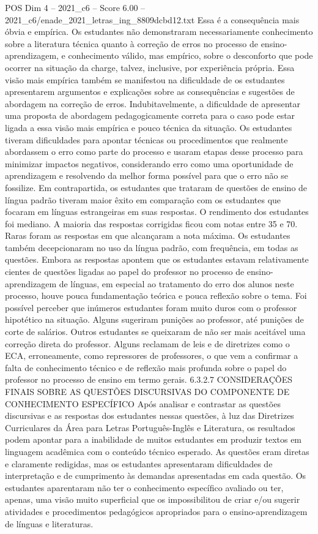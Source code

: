 \begin{textsample}{POS Dim 4 – 2021\_c6 – Score 6.00 – 2021\_c6/enade\_2021\_letras\_ing\_8809dcbd12.txt}
Essa é a consequência mais óbvia e empírica.
Os estudantes não demonstraram necessariamente conhecimento sobre a literatura técnica quanto à correção de erros no processo de ensino-aprendizagem, e conhecimento válido, mas empírico, sobre o desconforto que pode ocorrer na situação da charge, talvez, inclusive, por experiência própria.
Essa visão mais empírica também se manifestou na dificuldade de os estudantes apresentarem argumentos e explicações sobre as consequências e sugestões de abordagem na correção de erros.
Indubitavelmente, a dificuldade de apresentar uma proposta de abordagem pedagogicamente correta para o caso pode estar ligada a essa visão mais empírica e pouco técnica da situação.
Os estudantes tiveram dificuldades para apontar técnicas ou procedimentos que realmente abordassem o erro como parte do processo e usaram etapas desse processo para minimizar impactos negativos, considerando erro como uma oportunidade de aprendizagem e resolvendo da melhor forma possível para que o erro não se fossilize.
Em contrapartida, os estudantes que trataram de questões de ensino de língua padrão tiveram maior êxito em comparação com os estudantes que focaram em línguas estrangeiras em suas respostas.
O rendimento dos estudantes foi mediano.
A maioria das respostas corrigidas ficou com notas entre 35 e 70.
Raras foram as respostas em que alcançaram a nota máxima.
Os estudantes também decepcionaram no uso da língua padrão, com frequência, em todas as questões.
Embora as respostas apontem que os estudantes estavam relativamente cientes de questões ligadas ao papel do professor no processo de ensino-aprendizagem de línguas, em especial ao tratamento do erro dos alunos neste processo, houve pouca fundamentação teórica e pouca reflexão sobre o tema.
Foi possível perceber que inúmeros estudantes foram muito duros com o professor hipotético na situação.
Alguns sugeriram punições ao professor, até punições de corte de salários.
Outros estudantes se queixaram de não ser mais aceitável uma correção direta do professor.
Alguns reclamam de leis e de diretrizes como o ECA, erroneamente, como repressores de professores, o que vem a confirmar a falta de conhecimento técnico e de reflexão mais profunda sobre o papel do professor no processo de ensino em termo gerais. 6.3.2.7 CONSIDERAÇÕES FINAIS SOBRE AS QUESTÕES DISCURSIVAS DO COMPONENTE DE CONHECIMENTO ESPECÍFICO Após analisar e contrastar as questões discursivas e as respostas dos estudantes nessas questões, à luz das Diretrizes Curriculares da Área para Letras Português-Inglês e Literatura, os resultados podem apontar para a inabilidade de muitos estudantes em produzir textos em linguagem acadêmica com o conteúdo técnico esperado.
As questões eram diretas e claramente redigidas, mas os estudantes apresentaram dificuldades de interpretação e de cumprimento às demandas apresentadas em cada questão.
Os estudantes aparentaram não ter o conhecimento específico avaliado ou ter, apenas, uma visão muito superficial que os impossibilitou de criar e/ou sugerir atividades e procedimentos pedagógicos apropriados para o ensino-aprendizagem de línguas e literaturas.

\end{textsample}
